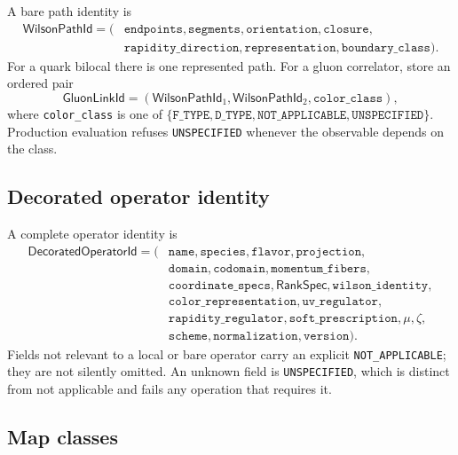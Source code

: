 \documentclass[11pt]{article}
\begin{document}
A bare path identity is
\begin{equation}
\begin{aligned}
 \mathsf{WilsonPathId}=(&\texttt{endpoints},\texttt{segments},
 \texttt{orientation},\texttt{closure},\\
 &\texttt{rapidity\_direction},\texttt{representation},
 \texttt{boundary\_class}).
\end{aligned}
\label{eq:wilson-path-id}
\end{equation}
For a quark bilocal there is one represented path.  For a gluon correlator,
store an ordered pair
\begin{equation}
 \mathsf{GluonLinkId}
 =(\mathsf{WilsonPathId}_1,\mathsf{WilsonPathId}_2,
 \texttt{color\_class}),
\label{eq:gluon-link-id}
\end{equation}
where \texttt{color\_class} is one of
\(\{\texttt{F\_TYPE},\texttt{D\_TYPE},
\texttt{NOT\_APPLICABLE},\texttt{UNSPECIFIED}\}\).  Production evaluation
refuses \texttt{UNSPECIFIED} whenever the observable depends on the class.

\subsection{Decorated operator identity}

A complete operator identity is
\begin{equation}
\begin{aligned}
 \mathsf{DecoratedOperatorId}=\bigl(&
 \texttt{name},\texttt{species},\texttt{flavor},\texttt{projection},\\
 &\texttt{domain},\texttt{codomain},\texttt{momentum\_fibers},\\
 &\texttt{coordinate\_specs},\mathsf{RankSpec},
 \texttt{wilson\_identity},\\
 &\texttt{color\_representation},\texttt{uv\_regulator},\\
 &\texttt{rapidity\_regulator},\texttt{soft\_prescription},\mu,\zeta,\\
 &\texttt{scheme},\texttt{normalization},\texttt{version}\bigr).
\end{aligned}
\label{eq:decorated-operator-id}
\end{equation}
Fields not relevant to a local or bare operator carry an explicit
\texttt{NOT\_APPLICABLE}; they are not silently omitted.  An unknown field is
\texttt{UNSPECIFIED}, which is distinct from not applicable and fails any
operation that requires it.

\subsection{Map classes}
\end{document}

